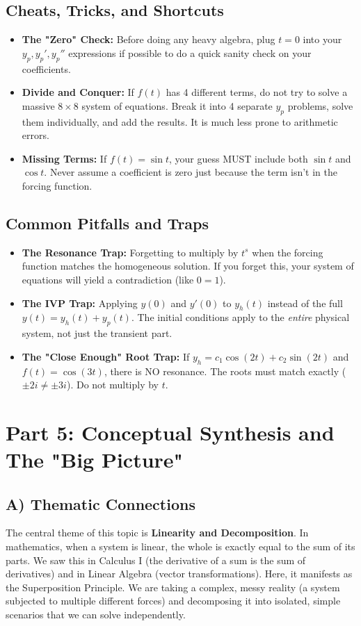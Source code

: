 \documentclass[12pt]{article}
\begin{document}
\subsection{Cheats, Tricks, and Shortcuts}
\begin{itemize}
    \item \textbf{The "Zero" Check:} Before doing any heavy algebra, plug $t=0$ into your $y_p, y_p', y_p''$ expressions if possible to do a quick sanity check on your coefficients.
    \item \textbf{Divide and Conquer:} If $f(t)$ has 4 different terms, do not try to solve a massive $8 \times 8$ system of equations. Break it into 4 separate $y_p$ problems, solve them individually, and add the results. It is much less prone to arithmetic errors.
    \item \textbf{Missing Terms:} If $f(t) = \sin t$, your guess MUST include both $\sin t$ and $\cos t$. Never assume a coefficient is zero just because the term isn't in the forcing function.
\end{itemize}

\subsection{Common Pitfalls and Traps}
\begin{itemize}
    \item \textbf{The Resonance Trap:} Forgetting to multiply by $t^s$ when the forcing function matches the homogeneous solution. If you forget this, your system of equations will yield a contradiction (like $0 = 1$).
    \item \textbf{The IVP Trap:} Applying $y(0)$ and $y'(0)$ to $y_h(t)$ instead of the full $y(t) = y_h(t) + y_p(t)$. The initial conditions apply to the \textit{entire} physical system, not just the transient part.
    \item \textbf{The "Close Enough" Root Trap:} If $y_h = c_1 \cos(2t) + c_2 \sin(2t)$ and $f(t) = \cos(3t)$, there is NO resonance. The roots must match exactly ($\pm 2i \neq \pm 3i$). Do not multiply by $t$.
\end{itemize}

\newpage
\section{Part 5: Conceptual Synthesis and The "Big Picture"}

\subsection{A) Thematic Connections}
The central theme of this topic is \textbf{Linearity and Decomposition}. In mathematics, when a system is linear, the whole is exactly equal to the sum of its parts. We saw this in Calculus I (the derivative of a sum is the sum of derivatives) and in Linear Algebra (vector transformations). Here, it manifests as the Superposition Principle. We are taking a complex, messy reality (a system subjected to multiple different forces) and decomposing it into isolated, simple scenarios that we can solve independently.
\end{document}
